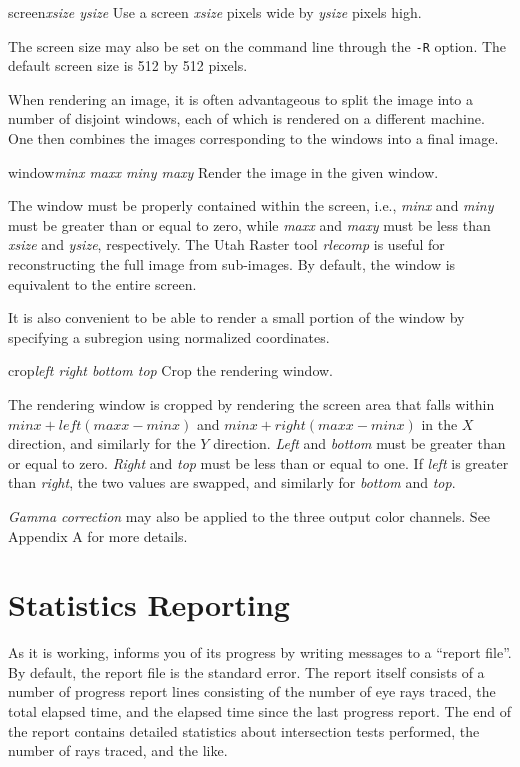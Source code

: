 \begin{defkey}{screen}{{\em xsize ysize}}
	Use a screen {\em xsize} pixels wide by {\em ysize} pixels high.
\end{defkey}
The screen size may also be set on the command line through
the {\tt -R} option.
The default
screen size is 512 by 512 pixels.

When rendering an image, it is often advantageous to split the image
into a number of disjoint windows, each of which is rendered
on a different machine.  One then combines the images corresponding to
the windows into a final image.

\begin{defkey}{window}{{\em minx maxx miny maxy}}
	Render the image in the given window.
\end{defkey}
The window must be properly
contained within the screen, i.e., {\em minx} and {\em miny} must
be greater than or equal to zero, while {\em maxx} and
{\em maxy} must be less than {\em xsize} and {\em ysize}, respectively.
The Utah Raster tool
{\em rlecomp\/} is useful for reconstructing the full image from
sub-images.
By default, the window
is equivalent to the entire screen.

It is also convenient to be able to render a small portion
of the window by specifying a subregion using normalized coordinates.

\begin{defkey}{crop}{{\em left right bottom top}}
	Crop the rendering window.
\end{defkey}
The rendering window is cropped by rendering the screen
area that falls within $minx + left(maxx - minx)$ and
$minx + right(maxx - minx)$ in the $X$ direction, and similarly
for the $Y$ direction.
{\em Left} and {\em bottom} must be greater than or equal to zero.
{\em Right} and {\em top} must be less than or equal to one.
If {\em left} is greater than {\em right}, the two values are
swapped, and similarly for {\em bottom} and {\em top}.

{\em Gamma correction} may also be applied to the three output color
channels.  See Appendix A for more details.

\section{Statistics Reporting}

As it is working, \rayshade informs you of its progress by writing
messages to a ``report file''.  By default, the report file is the
standard error.  The report itself consists of a number of
progress report lines consisting of the number of eye rays traced,
the total elapsed time, and the elapsed time since the last progress report.
The end of the report contains detailed statistics about intersection
tests performed, the number of rays traced, and the like.

